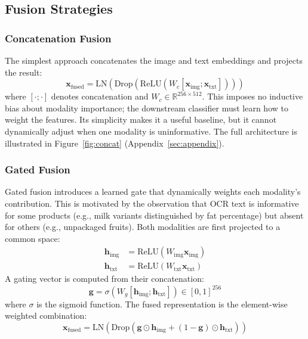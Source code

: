 \documentclass[10pt,twocolumn]{article}
\begin{document}
\subsection{Fusion Strategies}

\subsubsection{Concatenation Fusion}

The simplest approach concatenates the image and text embeddings and projects the result:
\begin{equation}
    \mathbf{x}_{\text{fused}} = \text{LN}(\text{Drop}(\text{ReLU}(W_c [\mathbf{x}_{\text{img}}; \mathbf{x}_{\text{txt}}])))
\end{equation}
where $[\cdot;\cdot]$ denotes concatenation and $W_c \in \mathbb{R}^{256 \times 512}$. This imposes no inductive bias about modality importance; the downstream classifier must learn how to weight the features. Its simplicity makes it a useful baseline, but it cannot dynamically adjust when one modality is uninformative. The full architecture is illustrated in Figure~\ref{fig:concat} (Appendix~\ref{sec:appendix}).

\subsubsection{Gated Fusion}

Gated fusion introduces a learned gate that dynamically weights each modality's contribution. This is motivated by the observation that OCR text is informative for some products (e.g., milk variants distinguished by fat percentage) but absent for others (e.g., unpackaged fruits). Both modalities are first projected to a common space:
\begin{align}
    \mathbf{h}_{\text{img}} &= \text{ReLU}(W_{\text{img}} \mathbf{x}_{\text{img}}) \\
    \mathbf{h}_{\text{txt}} &= \text{ReLU}(W_{\text{txt}} \mathbf{x}_{\text{txt}})
\end{align}
A gating vector is computed from their concatenation:
\begin{equation}
    \mathbf{g} = \sigma(W_g [\mathbf{h}_{\text{img}}; \mathbf{h}_{\text{txt}}]) \in [0, 1]^{256}
\end{equation}
where $\sigma$ is the sigmoid function. The fused representation is the element-wise weighted combination:
\begin{equation}
    \mathbf{x}_{\text{fused}} = \text{LN}(\text{Drop}(\mathbf{g} \odot \mathbf{h}_{\text{img}} + (1 - \mathbf{g}) \odot \mathbf{h}_{\text{txt}}))
\end{equation}
\end{document}
